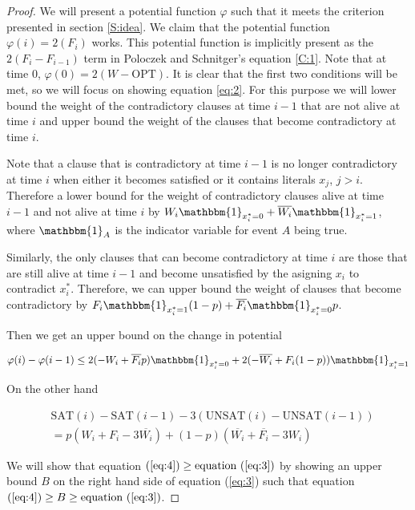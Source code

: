 \documentclass[11pt,letter]{article}
\numberwithin{theorem}{section}
\renewcommand{\phi}{\varphi}
\begin{document}
\begin{proof}
We will present a potential function $\phi$ such that it meets the criterion presented in section \ref{S:idea}. We claim that the potential function 
$\phi(i) = 2(F_i)$ works. This potential function is implicitly present as the $2(F_i - F_{i-1})$ term in Poloczek and Schnitger's equation \ref{C:1}. Note that at time $0$,
 $\phi(0) = 2(W-\textrm{OPT})$. It is clear that the first two conditions will be met, so we will focus on showing equation \ref{eq:2}.
 For this purpose we will lower bound the weight of the contradictory clauses at time $i-1$ that are not alive at time $i$
 and upper bound the weight of the clauses that become contradictory at time $i$.

Note that a clause that is contradictory at time $i-1$ is no longer contradictory at time $i$ when either it becomes satisfied
or it contains literals $x_j$, $j > i$. Therefore a lower bound for the weight of contradictory clauses alive at time $i-1$ and
 not alive at time $i$ by $W_i \mathbbm{1}_{x_i^* = 0} + \overline{W_i} \mathbbm{1}_{x_i^* = 1}$, where $\mathbbm{1}_A$ is the indicator variable for event $A$ being true.

Similarly, the only clauses that can become contradictory at time $i$ are those that are still alive at time $i-1$ and become unsatisfied
 by the asigning $x_i$ to contradict $x_i^*$. Therefore, we can upper bound the weight of clauses that become contradictory by
 $F_i \mathbbm{1}_{x_i^* = 1} (1-p) + \overline{F_i} \mathbbm{1}_{x_i^* = 0}p$.

Then we get an upper bound on the change in potential

\begin{equation}
\label{eq:3}
\phi(i) - \phi(i-1) \leq 2(-W_i + \overline{F_i} p) \mathbbm{1}_{x_i^* = 0} + 2(-\overline{W_i} + F_i(1-p))\mathbbm{1}_{x_i^* = 1}
\end{equation}

On the other hand

\begin{equation}
\begin{aligned}
\label{eq:4}
& \textrm{SAT}(i) - \textrm{SAT}(i-1) - 3(\textrm{UNSAT}(i) - \textrm{UNSAT}(i-1)) \\
& = p(W_i + F_i - 3\overline{W_i}) + (1-p)(\overline{W_i} + \overline{F_i} - 3W_i)
\end{aligned}
\end{equation}

We will show that equation $(\ref{eq:4}) \geq \text{equation } (\ref{eq:3})$ by showing an upper bound $B$ on the right hand side of equation (\ref{eq:3}) such that equation $(\ref{eq:4}) \geq B \geq \text{equation } (\ref{eq:3})$.


\end{proof}
\end{document}
